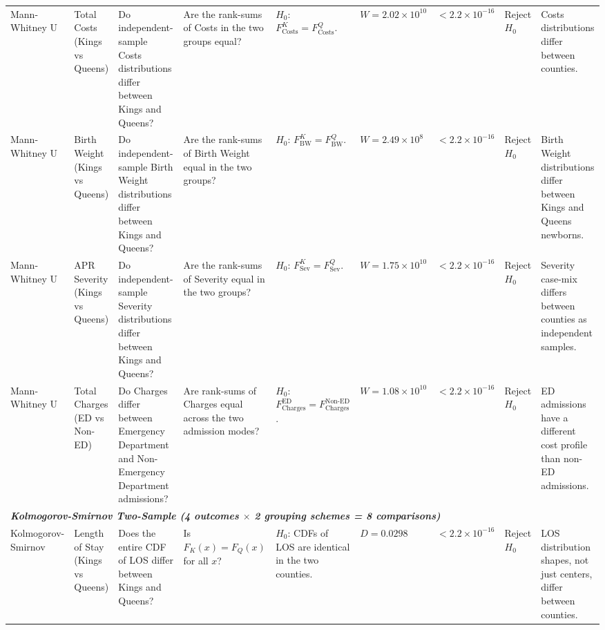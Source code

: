 \documentclass[12pt]{article}
\begin{document}
\begin{landscape}
\begin{scriptsize}
\begin{longtable}{p{2.0cm} p{2.4cm} p{3.0cm} p{2.7cm} p{2.5cm} p{1.7cm} p{1.3cm} p{1.3cm} p{3.0cm}}
Mann-Whitney U & Total Costs (Kings vs Queens) & Do independent-sample Costs distributions differ between Kings and Queens? & Are the rank-sums of Costs in the two groups equal? & $H_0$: $F_{\mathrm{Costs}}^{K} = F_{\mathrm{Costs}}^{Q}$. & $W = 2.02 \times 10^{10}$ & $< 2.2 \times 10^{-16}$ & Reject $H_0$ & Costs distributions differ between counties. \\

Mann-Whitney U & Birth Weight (Kings vs Queens) & Do independent-sample Birth Weight distributions differ between Kings and Queens? & Are the rank-sums of Birth Weight equal in the two groups? & $H_0$: $F_{\mathrm{BW}}^{K} = F_{\mathrm{BW}}^{Q}$. & $W = 2.49 \times 10^{8}$ & $< 2.2 \times 10^{-16}$ & Reject $H_0$ & Birth Weight distributions differ between Kings and Queens newborns. \\

Mann-Whitney U & APR Severity (Kings vs Queens) & Do independent-sample Severity distributions differ between Kings and Queens? & Are the rank-sums of Severity equal in the two groups? & $H_0$: $F_{\mathrm{Sev}}^{K} = F_{\mathrm{Sev}}^{Q}$. & $W = 1.75 \times 10^{10}$ & $< 2.2 \times 10^{-16}$ & Reject $H_0$ & Severity case-mix differs between counties as independent samples. \\

Mann-Whitney U & Total Charges (ED vs Non-ED) & Do Charges differ between Emergency Department and Non-Emergency Department admissions? & Are rank-sums of Charges equal across the two admission modes? & $H_0$: $F_{\mathrm{Charges}}^{\mathrm{ED}} = F_{\mathrm{Charges}}^{\mathrm{Non\text{-}ED}}$. & $W = 1.08 \times 10^{10}$ & $< 2.2 \times 10^{-16}$ & Reject $H_0$ & ED admissions have a different cost profile than non-ED admissions. \\

\midrule
\multicolumn{9}{l}{\textit{\textbf{Kolmogorov-Smirnov Two-Sample (4 outcomes $\times$ 2 grouping schemes = 8 comparisons)}}} \\

Kolmogorov-Smirnov & Length of Stay (Kings vs Queens) & Does the entire CDF of LOS differ between Kings and Queens? & Is $F_{K}(x) = F_{Q}(x)$ for all $x$? & $H_0$: CDFs of LOS are identical in the two counties. & $D = 0.0298$ & $< 2.2 \times 10^{-16}$ & Reject $H_0$ & LOS distribution shapes, not just centers, differ between counties. \\


\end{longtable}
\end{scriptsize}
\end{landscape}
\end{document}
